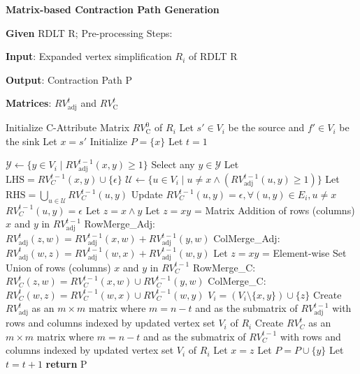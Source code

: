 \begin{algorithm}[t]
\caption{\textbf{Matrix-based Contraction Path Generation}}
\label{alg:MCA_phase1}
\textbf{Given} RDLT R; Pre-processing Steps:

\textbf{Input}: Expanded vertex simplification $R_i$ of RDLT R

\textbf{Output}: Contraction Path P

\textbf{Matrices}: $RV^{t}_{\text{adj}}$ and $RV^{t}_{\text{C}}$

\begin{algorithmic}[1]

\State Initialize C-Attribute Matrix $RV^{0}_{\text{C}}$ of $R_i$
\State Let $s' \in V_i$ be the source and $f' \in V_i$ be the sink
\State Let $x = s'$
\State Initialize $P = \{x\}$
\State Let $t = 1$


    \State $\mathcal{Y} \leftarrow \{ y \in V_i \mid RV^{t-1}_{\text{adj}}(x,y) \geq 1 \}$
    \State Select any $y \in \mathcal{Y}$
    \State Let $\text{LHS} = RV^{t-1}_{C}(x,y) \cup \{\epsilon\}$
    \State $\mathcal{U} \leftarrow \{ u \in V_i \mid u \neq x \wedge (RV^{t-1}_{\text{adj}}(u,y) \geq 1) \}$
    \State Let $\text{RHS} = \bigcup_{u \in \mathcal{U}} RV^{t-1}_{C}(u,y)$
        \State Update $RV^{t-1}_{C}(u,y) = \epsilon, \forall (u,y) \in E_i, u \neq x$
            \State $RV^{t-1}_{C}(u,y) = \epsilon$
        \EndFor
        \State Let $z = x \land y$
        \State Let $z = xy$ = Matrix Addition of rows (columns) $x$ and $y$ in $RV^{t-1}_{\text{adj}}$
            \State RowMerge\_Adj: $RV^{t}_{\text{adj}}(z,w) = RV^{t-1}_{\text{adj}}(x,w) + RV^{t-1}_{\text{adj}}(y,w)$
            \State ColMerge\_Adj: $RV^{t}_{\text{adj}}(w,z) = RV^{t-1}_{\text{adj}}(w,x) + RV^{t-1}_{\text{adj}}(w,y)$
        \EndFor
        \State Let $z = xy$ = Element-wise Set Union of rows (columns) $x$ and $y$ in $RV^{t-1}_{C}$
            \State RowMerge\_C: $RV^{t}_{C}(z,w) = RV^{t-1}_{C}(x,w) \cup RV^{t-1}_{C}(y,w)$
            \State ColMerge\_C: $RV^{t}_{C}(w,z) = RV^{t-1}_{C}(w,x) \cup RV^{t-1}_{C}(w,y)$
        \EndFor
        \State $V_i = (V_i \setminus \{x,y\}) \cup \{z\}$
        \State Create $RV^{t}_{\text{adj}}$ as an $m \times m$ matrix where $m = n - t$ and as the submatrix of $RV^{t-1}_{\text{adj}}$ with rows and columns indexed by updated vertex set $V_i$ of $R_i$
        \State Create $RV^{t}_{C}$ as an $m \times m$ matrix where $m = n - t$ and as the submatrix of $RV^{t-1}_{C}$ with rows and columns indexed by updated vertex set $V_i$ of $R_i$
        \State Let $x = z$
        \State Let $P = P \cup \{y\}$
        \State Let $t = t + 1$
    \EndIf
\EndWhile
\State \textbf{return} P
\end{algorithmic}
\end{algorithm}
